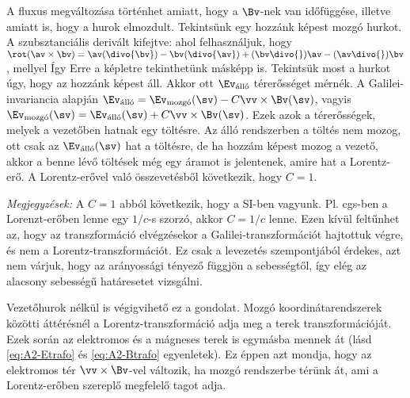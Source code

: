   A fluxus megváltozása történhet amiatt, hogy a $\Bv$-nek van időfüggése, illetve amiatt is, hogy a hurok elmozdult.
   Tekintsünk egy hozzánk képest mozgó hurkot.
   A szubsztanciális derivált kifejtve:
  ahol felhasználjuk, hogy $\rot(\av\times\bv)=\av(\divo{\bv})-\bv(\divo{\av})+(\bv\divo{})\av-(\av\divo{})\bv$, mellyel
  Így
  Erre a képletre tekinthetünk másképp is.
   Tekintsük most a hurkot úgy, hogy az hozzánk képest áll.
   Akkor ott $\Ev_\text{álló}$ térerősséget mérnék.
   A Galilei-invariancia alapján $\Ev_\text{álló}=\Ev_\text{mozgó}(\sv)-C\vv\times\Bv(\sv)$, vagyis $\Ev_\text{mozgó}(\sv)=\Ev_\text{álló}(\sv)+C\vv\times\Bv(\sv)$.
   Ezek azok a térerősségek, melyek a vezetőben hatnak egy töltésre.
   Az álló rendszerben a töltés nem mozog, ott csak az $\Ev_\text{álló}(\sv)$ hat a töltésre, de ha hozzám képest mozog a vezető, akkor a benne lévő töltések még egy áramot is jelentenek, amire hat a Lorentz-erő.
   A Lorentz-erővel való összevetésből következik, hogy $C=1$.
  
  \emph{Megjegyzések:} A $C=1$ abból következik, hogy a SI-ben vagyunk.
   Pl. cgs-ben a Lorenzt-erőben lenne egy $1/c$-s szorzó, akkor $C=1/c$ lenne.
   Ezen kívül feltűnhet az, hogy az transzformáció elvégzésekor a Galilei-transzformációt hajtottuk végre, és nem a Lorentz-transzformációt.
   Ez csak a levezetés szempontjából érdekes, azt nem várjuk, hogy az arányossági tényező függjön a sebességtől, így elég az alacsony sebességű  határesetet vizsgálni.
  
  Vezetőhurok nélkül is végigvihető ez a gondolat.
   Mozgó koordinátarendszerek közötti áttérésnél a Lorentz-transzformáció adja meg a terek transzformációját.
   Ezek során az elektromos és a mágneses terek is egymásba mennek át (lásd \eqref{eq:A2-Etrafo} és \eqref{eq:A2-Btrafo} egyenletek).
   Ez éppen azt mondja, hogy az elektromos tér $\vv\times \Bv$-vel változik, ha mozgó rendszerbe térünk át, ami a Lorentz-erőben szereplő megfelelő tagot adja.
  
